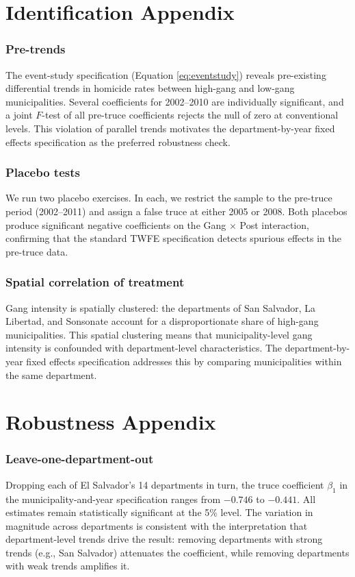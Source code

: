 \documentclass[12pt]{article}
\begin{document}
\section{Identification Appendix}
\label{sec:id_appendix}

\subsubsection*{Pre-trends} The event-study specification (Equation \ref{eq:eventstudy}) reveals pre-existing differential trends in homicide rates between high-gang and low-gang municipalities. Several coefficients for 2002--2010 are individually significant, and a joint $F$-test of all pre-truce coefficients rejects the null of zero at conventional levels. This violation of parallel trends motivates the department-by-year fixed effects specification as the preferred robustness check.

\subsubsection*{Placebo tests} We run two placebo exercises. In each, we restrict the sample to the pre-truce period (2002--2011) and assign a false truce at either 2005 or 2008. Both placebos produce significant negative coefficients on the Gang $\times$ Post interaction, confirming that the standard TWFE specification detects spurious effects in the pre-truce data.

\subsubsection*{Spatial correlation of treatment} Gang intensity is spatially clustered: the departments of San Salvador, La Libertad, and Sonsonate account for a disproportionate share of high-gang municipalities. This spatial clustering means that municipality-level gang intensity is confounded with department-level characteristics. The department-by-year fixed effects specification addresses this by comparing municipalities within the same department.


\section{Robustness Appendix}
\label{sec:robustness_appendix}

\subsubsection*{Leave-one-department-out} Dropping each of El Salvador's 14 departments in turn, the truce coefficient $\beta_1$ in the municipality-and-year specification ranges from $-0.746$ to $-0.441$. All estimates remain statistically significant at the 5\% level. The variation in magnitude across departments is consistent with the interpretation that department-level trends drive the result: removing departments with strong trends (e.g., San Salvador) attenuates the coefficient, while removing departments with weak trends amplifies it.
\end{document}
